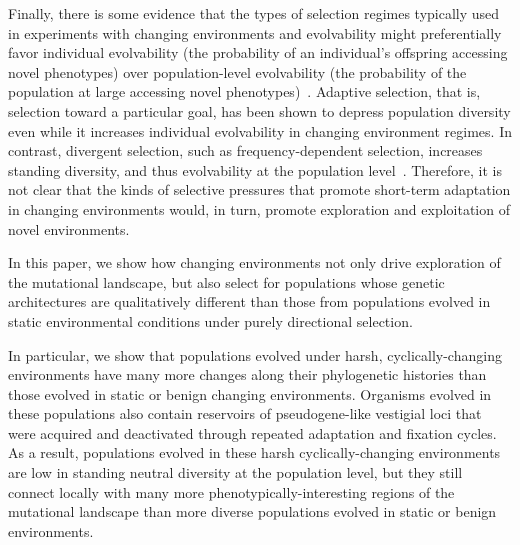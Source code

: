 \documentclass[10pt,letterpaper]{article}
\begin{document}
Finally, there is some evidence that the types of selection regimes typically used in experiments with changing environments and evolvability might preferentially favor individual evolvability (the probability of an individual's offspring accessing novel phenotypes) over population-level evolvability (the probability of the population at large accessing novel phenotypes)~\cite{wilder_reconciling_2015,lehman_critical_2016}. Adaptive selection, that is, selection toward a particular goal, has been shown to depress population diversity even while it increases individual evolvability in changing environment regimes. In contrast, divergent selection, such as frequency-dependent selection, increases standing diversity, and thus evolvability at the population level~\cite{wilder_reconciling_2015}. Therefore, it is not clear that the kinds of selective pressures that promote short-term adaptation in changing environments would, in turn, promote exploration and exploitation of novel environments.




In this paper, we show how changing environments not only drive exploration of the mutational landscape, but also select for populations whose genetic architectures are qualitatively different than those from populations evolved in static environmental conditions under purely directional selection. 

In particular, we show that populations evolved under harsh, cyclically-changing environments have many more changes along their phylogenetic histories than those evolved in static or benign changing environments. Organisms evolved in these populations also contain reservoirs of pseudogene-like vestigial loci that were acquired and deactivated through repeated adaptation and fixation cycles. As a result, populations evolved in these harsh cyclically-changing environments are low in standing neutral diversity at the population level, but they still connect locally with many more phenotypically-interesting regions of the mutational landscape than more diverse populations evolved in static or benign environments.
\end{document}
